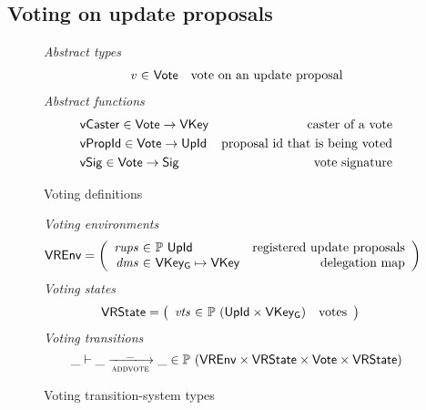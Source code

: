 \subsection{Voting on update proposals}
\label{sec:voting-on-update-proposals}

\begin{figure}[htb]
  \emph{Abstract types}
  \begin{equation*}
    \begin{array}{r@{~\in~}lr}
      \var{v} & \Vote & \text{vote on an update proposal}
    \end{array}
  \end{equation*}
  \emph{Abstract functions}
  \begin{align*}
    & \mathsf{vCaster} \in \mathsf{Vote} \to \mathsf{VKey} & \text{caster of a vote}\\
    & \mathsf{vPropId} \in \mathsf{Vote} \to \mathsf{UpId} & \text{proposal id that is being voted}\\
    & \mathsf{vSig} \in \mathsf{Vote} \to \mathsf{Sig} & \text{vote signature}
  \end{align*}
  \caption{Voting definitions}
  \label{fig:defs:voting}
\end{figure}

\begin{figure}[htb]
  \emph{Voting environments}
  \begin{align*}
    & \VREnv
      = \left(
      \begin{array}{r@{~\in~}lr}
        \var{rups} & \powerset{\UPropId}
        & \text{registered update proposals}\\
        \var{dms} & \VKeyGen \mapsto \VKey & \text{delegation map}
      \end{array}\right)
  \end{align*}
  \emph{Voting states}
  \begin{align*}
    & \VRState
      = \left(
      \begin{array}{r@{~\in~}lr}
        \var{vts} & \powerset{(\UPropId \times \VKeyGen)} & \text{votes}
      \end{array}\right)
  \end{align*}
  \emph{Voting transitions}
    \begin{equation*}
    \_ \vdash \_ \trans{addvote}{\_} \_ \in
    \powerset (\VREnv \times \VRState \times \Vote \times \VRState)
    \end{equation*}
  \caption{Voting transition-system types}
  \label{fig:ts-types:voting}
\end{figure}

